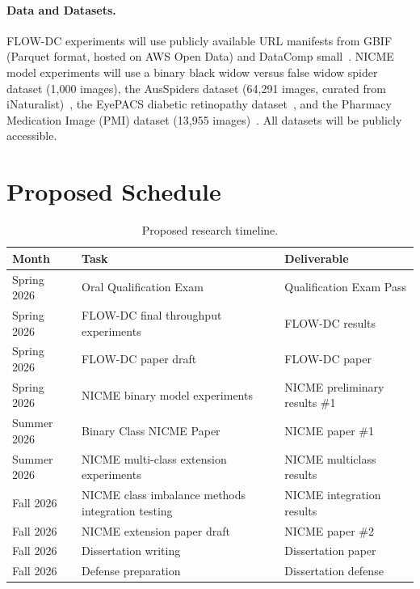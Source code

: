 \documentclass[11pt, letterpaper]{article}
\begin{document}
\paragraph{Data and Datasets.}
FLOW-DC experiments will use publicly available URL manifests from
GBIF (Parquet format, hosted on AWS Open Data) and DataComp
small~\cite{gadre2023datacomp}. NICME model experiments will use a binary black widow
versus false widow spider dataset (1,000 images), the AusSpiders dataset
(64,291 images, curated from iNaturalist)~\cite{deng2026aranet}, the EyePACS
diabetic retinopathy dataset~\cite{galdran2020}, and the Pharmacy Medication
Image (PMI) dataset (13,955 images)~\cite{chen2025csada}. All datasets will be
publicly accessible.

\section{Proposed Schedule}
\label{sec:schedule}

\begin{table}[H]
    \centering
    \footnotesize
    \renewcommand{\arraystretch}{0.95}
    \caption{Proposed research timeline.}
    \label{tab:schedule}
    \begin{tabular}{@{}lll@{}}
        \toprule
        \textbf{Month} & \textbf{Task} & \textbf{Deliverable} \\
        \midrule
        Spring 2026 & Oral Qualification Exam & Qualification Exam Pass \\
        Spring 2026 & FLOW-DC final throughput experiments & FLOW-DC results \\
        Spring 2026 & FLOW-DC paper draft & FLOW-DC paper \\
        Spring 2026 & NICME binary model experiments & NICME preliminary results \#1 \\
        Summer 2026 & Binary Class NICME Paper & NICME paper \#1 \\
        Summer 2026 & NICME multi-class extension experiments & NICME multiclass results \\
        Fall 2026 & NICME class imbalance methods integration testing & NICME integration results \\
        Fall 2026 & NICME extension paper draft & NICME paper \#2 \\
        Fall 2026 & Dissertation writing & Dissertation paper \\
        Fall 2026 & Defense preparation & Dissertation defense \\
        \bottomrule
    \end{tabular}
\end{table}

\newpage
\begingroup
\small
\setlength{\bibsep}{2pt plus 1pt minus 1pt}


\endgroup
\end{document}
